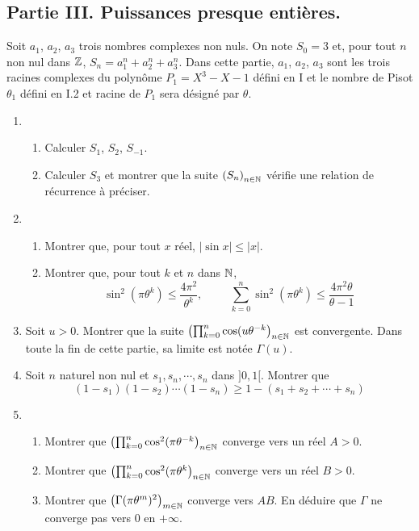 \subsection*{Partie III. Puissances presque entières.}
Soit $a_1$, $a_2$, $a_3$ trois nombres complexes non nuls. On note $S_0=3$ et, pour tout $n$ non nul dans $\mathbb{Z}$, $S_n=a_1^n+a_2^n+a_3^n$.\newline
Dans cette partie, $a_1$, $a_2$, $a_3$ sont les trois racines complexes du polynôme  $P_1=X^3-X-1$ défini en I et le nombre de Pisot $\theta_1$ défini en I.2 et racine de $P_1$ sera désigné par $\theta$.
\begin{enumerate}
\item
\begin{enumerate}
 \item Calculer $S_1$, $S_2$, $S_{-1}$.
 \item Calculer $S_3$ et montrer que la suite $\left(S_n\right) _{n\in \mathbb{N}}$ vérifie une relation de récurrence à préciser.
\end{enumerate}

\item 
\begin{enumerate}
 \item Montrer que, pour tout $x$ réel, $|\sin x|\leq |x|$.
 \item Montrer que, pour tout $k$ et $n$ dans $\mathbb{N}$,
\begin{displaymath}
 \sin^2(\pi \theta^k)\leq \frac{4\pi^2}{\theta^k},\hspace{1cm}
\sum_{k=0}^n \sin^2(\pi \theta^k)\leq \frac{4\pi^2\theta}{\theta -1}
\end{displaymath}
\end{enumerate}

\item Soit $u>0$. Montrer que la suite $\left( \prod_{k=0}^n\cos(u\theta^{-k}\right) _{n\in \mathbb{N}}$ est convergente. Dans toute la fin de cette partie, sa limite est notée $\Gamma(u)$.

\item Soit $n$ naturel non nul et $s_1,s_n,\cdots,s_n$ dans $]0,1[$. Montrer que
\begin{displaymath}
 (1-s_1)(1-s_2)\cdots(1-s_n)\geq 1-\left(s_1+s_2+\cdots+s_n\right)  
\end{displaymath}

\item 
\begin{enumerate}
 \item Montrer que $\left( \prod_{k=0}^n\cos^2(\pi\theta^{-k}\right) _{n\in \mathbb{N}}$ converge vers un réel $A>0$.
 \item Montrer que $\left( \prod_{k=0}^n\cos^2(\pi\theta^{k}\right) _{n\in \mathbb{N}}$ converge vers un réel $B>0$.
 \item Montrer que $\left( \Gamma(\pi\theta^{m})^2\right) _{m\in \mathbb{N}}$ converge vers $AB$. En déduire que $\Gamma$ ne converge pas vers $0$ en $+\infty$.
\end{enumerate}

 \end{enumerate}
